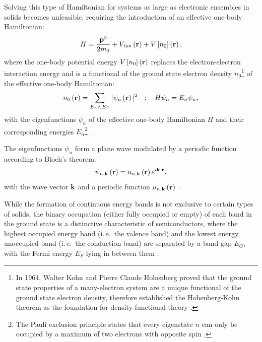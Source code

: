 Solving this type of Hamiltonian for systems as large as electronic ensembles in solids becomes unfeasible, requiring the introduction of an effective one-body Hamiltonian:
\begin{equation}
H = \frac{\vb{p}^2}{2m_0} + V_{\mathit{ion}}\left(\vb{r}\right) + V\left[n_0\right]\left(\vb{r}\right),
\end{equation}
where the one-body potential energy $V\left[n_0\right]\left(\vb{r}\right)$ replaces the electron-electron interaction energy and is a functional of the ground state electron density $n_0$\footnote{In 1964, Walter Kohn and Pierre Claude Hohenberg proved that the ground state properties of a many-electron system are a unique functional of the ground state electron density, therefore established the Hohenberg-Kohn theorem as the foundation for density functional theory \cite{Hohenberg1964}.} of the effective one-body Hamiltonian:
\begin{equation}
  n_0\left(\vb{r}\right) = \sum_{E_n < E_F} |\psi_n\left(\vb{r}\right)|^2 \quad ; \quad H\psi_n = E_n\psi_n,
\end{equation}
with the eigenfunctions $\psi_n$ of the effective one-body Hamiltonian $H$ and their corresponding energies $E_n$\footnote{The Pauli exclusion principle states that every eigenstate $n$ can only be occupied by a maximum of two electrons with opposite spin \cite{Kittel1987,Kittel2004,Yu2010}.} \cite{Kittel1987,Piprek2003,Yu2010}.

The eigenfunctions $\psi_n$ form a plane wave modulated by a periodic function according to Bloch's theorem:
\begin{equation}
  \label{eq:bloch-theorem}
  \psi_{n,\vb{k}}\left(\vb{r}\right) = u_{n,\vb{k}}\left(\vb{r}\right) e^{i\vb{k} \cdot \vb{r}},
\end{equation}
with the wave vector $\vb{k}$ and a periodic function $u_{n,\vb{k}}\left(\vb{r}\right)$ \cite{Kittel1987,Piprek2003,Yu2010}.

While the formation of continuous energy bands is not exclusive to certain types of solids, the binary occupation (either fully occupied or empty) of each band in the ground state is a distinctive characteristic of semiconductors, where the highest occupied energy band (i.\,e.\ the valence band) and the lowest energy unoccupied band (i.\,e.\ the conduction band) are separated by a band gap $E_G$, with the Fermi energy $E_F$ lying in between them \cite{Kittel1987,Piprek2003,Yu2010}.
